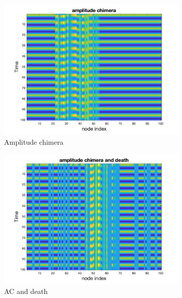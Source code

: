 \documentclass[12pt]{article}
\begin{document}
\begin{figure}[h]
\centering
\begin{subfigure}[b]{0.4\textwidth}
    \centering
    \includegraphics[width=\textwidth]{General Diagrams/amplitude chimera.png}
    \caption{Amplitude chimera }
    \label{fig: amplitude chimera}
\end{subfigure}
\hfill
\begin{subfigure}[b]{0.4\textwidth}
    \centering
    \includegraphics[width=\textwidth]{General Diagrams/amplitude chimera and death.png}
    \caption{AC and death }
    \label{fig:ac and death}
\end{subfigure}
\hfill
\begin{subfigure}[b]{0.4\textwidth}

\end{subfigure}
\end{figure}
\end{document}
